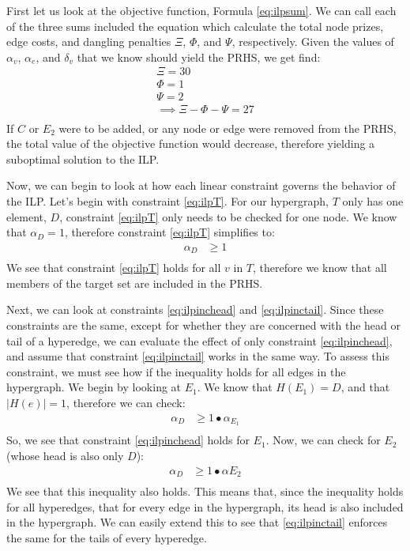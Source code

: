 \documentclass[12pt,twoside]{reedthesis}
\theoremstyle{definition}
\begin{document}
First let us look at the objective function, Formula \eqref{eq:ilpsum}. We can call each of the three sums included the equation which calculate the total node prizes, edge costs, and dangling penalties $\Xi$, $\Phi$, and $\Psi$, respectively. Given the values of $\alpha_v$, $\alpha_e$, and $\delta_v$ that we know should yield the PRHS, we get find:
\begin{gather*}
 \Xi = 30\\
 \Phi = 1\\
 \Psi = 2\\
 \implies \Xi - \Phi - \Psi = 27\\
\end{gather*}%
If $C$ or $E_2$ were to be added, or any node or edge were removed from the PRHS, the total value of the objective function would decrease, therefore yielding a suboptimal solution to the ILP.\par

Now, we can begin to look at how each linear constraint governs the behavior of the ILP. Let's begin with constraint \eqref{eq:ilpT}. For our hypergraph, $T$ only has one element, $D$, constraint \eqref{eq:ilpT} only needs to be checked for one node. We know that $\alpha_D = 1$, therefore constraint \eqref{eq:ilpT} simplifies to:
\begin{align*}
  \alpha_D &\geq 1\\
\end{align*}
We see that constraint \eqref{eq:ilpT} holds for all $v$ in $T$, therefore we know that all members of the target set are included in the PRHS.\par

Next, we can look at constraints \eqref{eq:ilpinchead} and \eqref{eq:ilpinctail}. Since these constraints are the same, except for whether they are concerned with the head or tail of a hyperedge, we can evaluate the effect of only constraint \eqref{eq:ilpinchead}, and assume that constraint \eqref{eq:ilpinctail} works in the same way. To assess this constraint, we must see how if the inequality holds for all edges in the hypergraph. We begin by looking at $E_1$. We know that $H({E_1})=D$, and that $\lvert H(e) \rvert = 1$, therefore we can check:
\begin{align*}
  \alpha_D &\geq 1 \bullet \alpha_{E_1}\\
\end{align*}%
So, we see that constraint \eqref{eq:ilpinchead} holds for $E_1$. Now, we can check for $E_2$ (whose head is also only $D$):
\begin{align*}
  \alpha_D &\geq 1 \bullet \alpha{E_2}\\
\end{align*}%
We see that this inequality also holds. This means that, since the inequality holds for all hyperedges, that for every edge in the hypergraph, its head is also included in the hypergraph. We can easily extend this to see that \eqref{eq:ilpinctail} enforces the same for the tails of every hyperedge.\par
\end{document}
